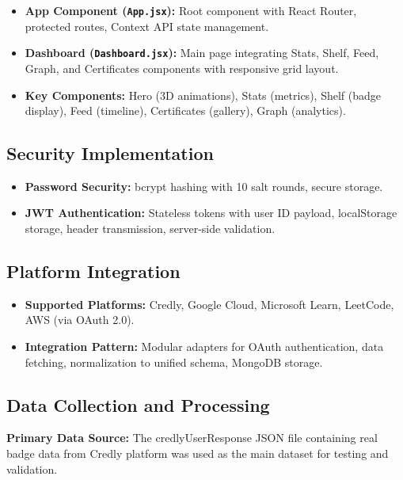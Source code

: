 \documentclass[12pt,a4paper]{article}
\begin{document}
\begin{itemize}[leftmargin=*]
\item \textbf{App Component (\texttt{App.jsx}):} Root component with React Router, protected routes, Context API state management.
\item \textbf{Dashboard (\texttt{Dashboard.jsx}):} Main page integrating Stats, Shelf, Feed, Graph, and Certificates components with responsive grid layout.
\item \textbf{Key Components:} Hero (3D animations), Stats (metrics), Shelf (badge display), Feed (timeline), Certificates (gallery), Graph (analytics).
\end{itemize}

\subsection{Security Implementation}

\begin{itemize}[leftmargin=*]
\item \textbf{Password Security:} bcrypt hashing with 10 salt rounds, secure storage.
\item \textbf{JWT Authentication:} Stateless tokens with user ID payload, localStorage storage, header transmission, server-side validation.
\end{itemize}

\subsection{Platform Integration}

\begin{itemize}[leftmargin=*]
\item \textbf{Supported Platforms:} Credly, Google Cloud, Microsoft Learn, LeetCode, AWS (via OAuth 2.0).
\item \textbf{Integration Pattern:} Modular adapters for OAuth authentication, data fetching, normalization to unified schema, MongoDB storage.
\end{itemize}

\subsection{Data Collection and Processing}

\textbf{Primary Data Source:} The credlyUserResponse JSON file containing real badge data from Credly platform was used as the main dataset for testing and validation.
\end{document}
